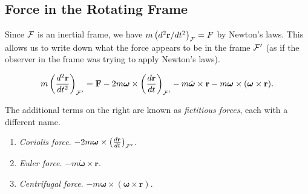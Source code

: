 \documentclass{scrartcl}
\newcommand{\vv}[1]{\boldsymbol{\mathbf{#1}}}
\theoremstyle{definition}
\begin{document}
\subsection*{Force in the Rotating Frame}

Since $\mathcal{F}$ is an inertial frame, we have $m\left(d^2 \vv r/ dt^2\right)_{\FF} = F$ by Newton's laws. This allows us to write down what the force appears to be in the frame $\mathcal{F}'$ (as if the observer in the frame was trying to apply Newton's laws).

$$
m \left(\frac{d^2 \vv r}{dt^2}\right)_{\FF'} = \vv F - 2m \vv \omega \times \left(\frac{d \vv r}{d t}\right)_{\FF'} - m\dot{\vv \omega} \times \vv r - m\vv \omega \times (\vv \omega \times \vv r).
$$

The additional terms on the right are known as \emph{fictitious forces}, each with a different name.

\begin{enumerate}
	\item \emph{Coriolis force}. $- 2m \vv \omega \times \left(\frac{d \vv r}{d t}\right)_{\FF'}$.
	\item \emph{Euler force}. $- m\dot{\vv \omega} \times \vv r$.
	\item \emph{Centrifugal force}. $- m\vv \omega \times (\vv \omega \times \vv r)$.
\end{enumerate}
\end{document}
